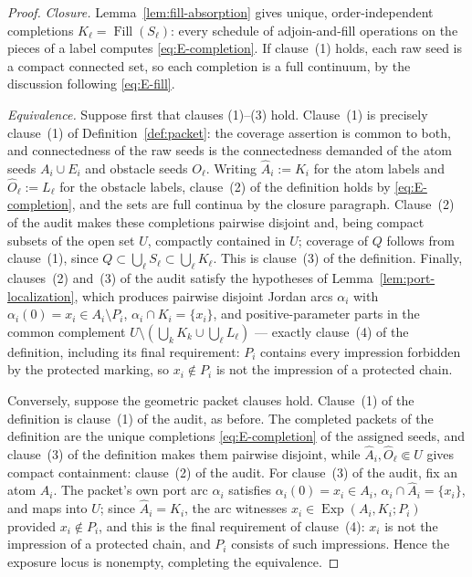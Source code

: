 \documentclass[11pt,reqno]{amsart}
\theoremstyle{definition}
\theoremstyle{remark}
\newcommand{\Fill}{\operatorname{Fill}}
\newcommand{\Exp}{\operatorname{Exp}}
\begin{document}
\begin{proof}
\emph{Closure.}
Lemma~\ref{lem:fill-absorption} gives unique, order-independent completions
$K_\ell=\Fill(S_\ell)$: every schedule of adjoin-and-fill operations on the pieces of
a label computes \eqref{eq:E-completion}. If clause~(1) holds, each raw seed is a
compact connected set, so each completion is a full continuum, by the discussion
following \eqref{eq:E-fill}.

\emph{Equivalence.}
Suppose first that clauses (1)--(3) hold. Clause~(1) is precisely clause~(1) of
Definition~\ref{def:packet}: the coverage assertion is common to both, and
connectedness of the raw seeds is the connectedness demanded of the atom seeds
$A_i\cup E_i$ and obstacle seeds $O_\ell$. Writing $\widehat A_i:=K_i$ for the atom
labels and $\widehat O_\ell:=L_\ell$ for the obstacle labels, clause~(2) of the
definition holds by \eqref{eq:E-completion}, and the sets are full continua by the
closure paragraph. Clause~(2) of the audit makes these completions pairwise disjoint
and, being compact subsets of the open set $U$, compactly contained in $U$; coverage
of $Q$ follows from clause~(1), since $Q\subset\bigcup_\ell S_\ell\subset
\bigcup_\ell K_\ell$. This is clause~(3) of the definition. Finally, clauses~(2)
and~(3) of the audit satisfy the hypotheses of
Lemma~\ref{lem:port-localization}, which produces pairwise disjoint Jordan arcs
$\alpha_i$ with $\alpha_i(0)=x_i\in A_i\setminus P_i$,
$\alpha_i\cap K_i=\{x_i\}$, and positive-parameter parts in the common complement
$U\setminus(\bigcup_kK_k\cup\bigcup_\ell L_\ell)$ --- exactly clause~(4) of the
definition, including its final requirement: $P_i$ contains every impression
forbidden by the protected marking, so $x_i\notin P_i$ is not the impression of a
protected chain.

Conversely, suppose the geometric packet clauses hold. Clause~(1) of the definition
is clause~(1) of the audit, as before. The completed packets of the definition are
the unique completions \eqref{eq:E-completion} of the assigned seeds, and clause~(3)
of the definition makes them pairwise disjoint, while
$\widehat A_i,\widehat O_\ell\Subset U$ gives compact containment: clause~(2) of the
audit. For clause~(3) of the audit, fix an atom $A_i$. The packet's own port arc
$\alpha_i$ satisfies $\alpha_i(0)=x_i\in A_i$, $\alpha_i\cap\widehat A_i=\{x_i\}$,
and maps into $U$; since $\widehat A_i=K_i$, the arc witnesses
$x_i\in\Exp(A_i,K_i;P_i)$ provided $x_i\notin P_i$, and this is the final requirement
of clause~(4): $x_i$ is not the impression of a protected chain, and $P_i$ consists
of such impressions. Hence the exposure locus is nonempty, completing the
equivalence.


\end{proof}
\end{document}
